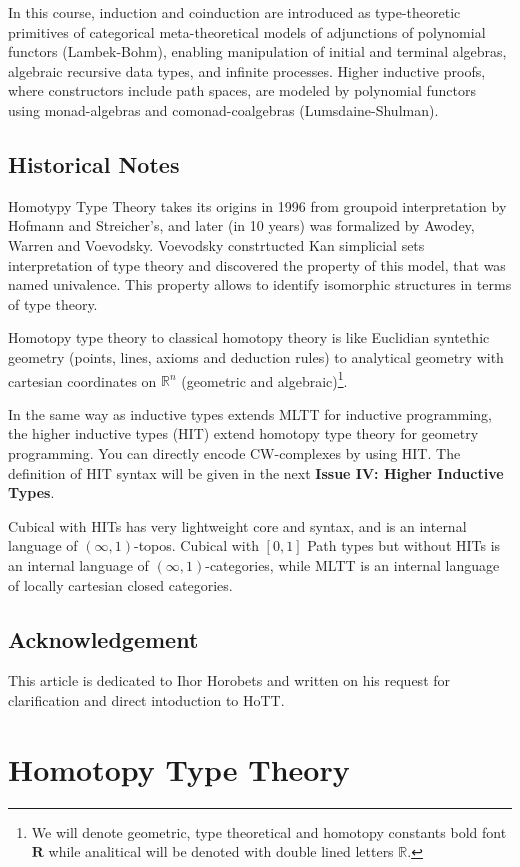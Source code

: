 \documentclass{article}
\theoremstyle{definition}
\begin{document}
In this course, induction and coinduction are introduced as type-theoretic
primitives of categorical meta-theoretical models of adjunctions of
polynomial functors (Lambek-Bohm), enabling manipulation of initial
and terminal algebras, algebraic recursive data types, and infinite
processes. Higher inductive proofs, where constructors include path
spaces, are modeled by polynomial functors using monad-algebras and
comonad-coalgebras (Lumsdaine-Shulman).

\subsection*{Historical Notes}
Homotypy Type Theory takes its origins in 1996 from groupoid interpretation by
Hofmann and Streicher's, and later (in 10 years) was formalized by Awodey,
Warren and Voevodsky. Voevodsky constrtucted Kan simplicial sets interpretation
of type theory and discovered the property of this model, that was named univalence.
This property allows to identify isomorphic structures in terms of type theory.

Homotopy type theory to classical homotopy theory is like Euclidian
syntethic geometry (points, lines, axioms and deduction rules) to
analytical geometry with cartesian coordinates on $\mathbb{R}^n$ (geometric and algebraic)\footnote{We will denote geometric, type theoretical and homotopy constants
bold font $\mathbf{R}$ while analitical will be denoted with double lined letters $\mathbb{R}$.}.

In the same way as inductive types extends MLTT for inductive programming,
the higher inductive types (HIT) extend homotopy type theory for geometry programming.
You can directly encode CW-complexes by using HIT. The definition of HIT syntax will
be given in the next {\bf Issue IV: Higher Inductive Types}.

Cubical with HITs has very lightweight core and syntax, and
is an internal language of $(\infty,1)$-topos.
Cubical with $[0,1]$ Path types but without HITs is an
internal language of $(\infty,1)$-categories, while MLTT
is an internal language of locally cartesian closed categories.

\subsection*{Acknowledgement}
This article is dedicated to Ihor Horobets and written on his
request for clarification and direct intoduction to HoTT.

\newpage
\section{Homotopy Type Theory}
\end{document}
